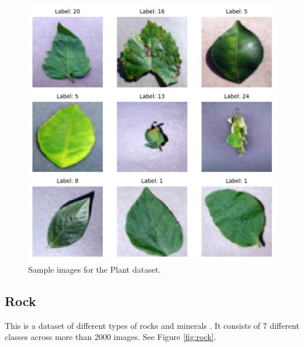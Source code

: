 \documentclass[letterpaper]{article} %
\theoremstyle{plain}
\theoremstyle{definition}
\theoremstyle{remark}
\begin{document}
\begin{figure}[htbp]
    \centering
    \includegraphics[width=\columnwidth]{../../images/plant_1_sample.jpg}
    \caption{Sample images for the Plant dataset.}
    \label{fig:plant}
\end{figure}

\subsection{Rock} This is a dataset of different types of rocks and minerals \citep{rock_data}. It consists of 7 different classes across more than 2000 images. See Figure \ref{fig:rock}.
\end{document}
